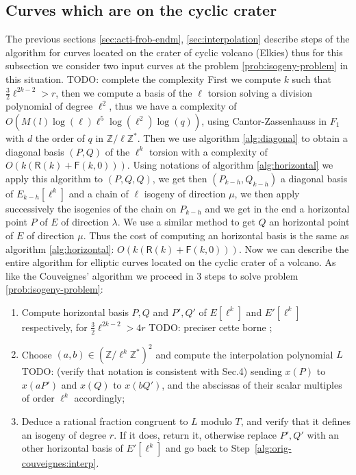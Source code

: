 \documentclass{lms}
\newcommand{\todo}[1]{{\color{red}TODO: #1}}
\begin{document}
 \subsection{Curves which are on the cyclic crater}
  The previous sections \ref{sec:acti-frob-endm}, \ref{sec:interpolation} describe steps of the algorithm for curves located on the crater of cyclic volcano (Elkies) thus for this subsection we consider two input curves at the problem \ref{prob:isogeny-problem} in this situation. 
\newline
\todo{complete the complexity}
 First we compute $k$ such that $\frac{3}{2}\ell^{2k-2}>r$, then we compute a basis of the $\ell$ torsion solving a division polynomial of degree $\ell^2$, thus we have a complexity of $O(M(l)\log(\ell) \ell^5 \log(\ell^2) \log(q))$, using Cantor-Zassenhauss in $F_1$ with $d$ the order of $q$ in $\mathbb{Z}/\ell\mathbb{Z}^*$.%
 Then we use algorithm \ref{alg:diagonal} to obtain a diagonal basis $(P,Q)$ of the $\ell^k$ torsion with a complexity of $O(k(\mathsf{R}(k)+\mathsf{F}(k,0)))$. Using notations of algorithm \ref{alg:horizontal} we apply this algorithm to $(P,Q,Q)$, we get then $(P_{k-h},Q_{k-h})$ a diagonal basis of $E_{k-h}[\ell^k]$ and a chain of $\ell$ isogeny of direction $\mu$, we then apply successively the isogenies of the chain on $P_{k-h}$ and we get in the end a horizontal point $P$ of $E$ of direction $\lambda$. We use a similar method to get $Q$ an horizontal point of $E$ of direction $\mu$. Thus the cost of computing an horizontal basis is the same as algorithm \ref{alg:horizontal}: $O(k(\mathsf{R}(k)+\mathsf{F}(k,0)))$.  Now we can describe the entire algorithm for elliptic curves located on the cyclic crater of a volcano.
\newline  
  As like the Couveignes' algorithm we proceed in 3 steps to solve problem \ref{prob:isogeny-problem}:
 \begin{enumerate}
\item Compute horizontal basis $P,Q$ and $P',Q'$ of
  $E[\ell^k]$ and $E'[\ell^k]$ respectively, for $\frac{3}{2}\ell^{2k-2} > 4r$ \todo{preciser cette borne} ;
\item\label{alg:modif-couveignes:interp} Choose $(a,b) \in (\mathbb{Z}/\ell^k\mathbb{Z}^*)^2$ and compute the interpolation
  polynomial $L$ \todo{(verify that notation is consistent
    with Sec.4)} sending $x(P)$ to $x(aP')$ and $x(Q)$ to $x(bQ')$, and the abscissas of
  their scalar multiples of order $\ell^k$ accordingly;
\item\label{alg:modif-couveignes:rational} Deduce a rational fraction
  congruent to $L$ modulo $T$, and verify that it
  defines an isogeny of degree $r$. If it does, return it, otherwise
  replace $P',Q'$ with an other horizontal basis of $E'[\ell^k]$ and go back to
  Step~\ref{alg:orig-couveignes:interp}.
\end{enumerate} 
\end{document}
